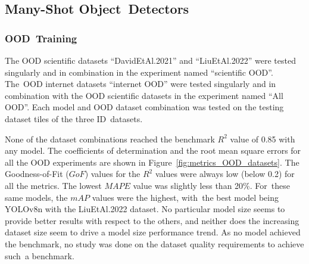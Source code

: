 \documentclass[12pt,a4paper,oneside]{report}
\begin{document}
\subsection{Many-Shot Object~Detectors}

\subsubsection{OOD~Training}

The OOD scientific datasets ``DavidEtAl.2021'' and ``LiuEtAl.2022'' were tested singularly 
and in combination in the experiment named ``scientific OOD''. The~OOD internet datasets ``internet OOD''
were tested singularly and in combination with the OOD scientific datasets in the experiment named ``All OOD''.
Each model and OOD dataset combination was tested on the testing dataset tiles of the three ID~datasets.


None of the dataset combinations reached the benchmark $R^2$ value of 0.85 with any model.
The coefficients of determination and the root mean square errors 
for all the OOD experiments are shown in Figure~\ref{fig:metrics_OOD_datasets}.
The Goodness-of-Fit ($GoF$) values for the $R^2$ values were always low (below 0.2) for all the metrics.
The lowest $MAPE$ value was slightly less than 20\%. For~these same models, the $mAP$ values
were the highest, with~the best model being YOLOv8n with the LiuEtAl.2022 dataset.
No particular model size seems to provide better results with respect to the others, and
neither does the increasing dataset size seem to drive a model size performance trend.
As no model achieved the benchmark, no study was done on the dataset quality requirements
to achieve such~a benchmark.
\end{document}
